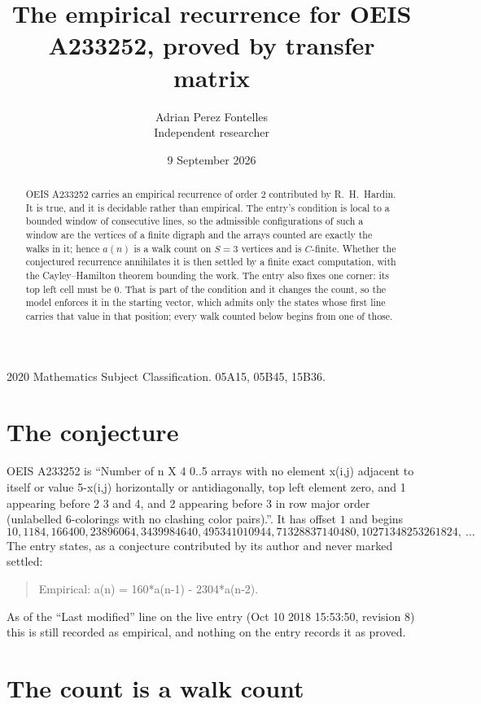 \documentclass[11pt,a4paper]{article}
\title{The empirical recurrence for OEIS A233252, proved by transfer matrix}
\author{Adrian Perez Fontelles\\ \small Independent researcher}
\date{9 September 2026}
\theoremstyle{plain}
\theoremstyle{definition}
\begin{document}
\maketitle

\begin{abstract}
OEIS A233252 carries an empirical recurrence of order $2$ contributed by R.~H.~Hardin. It is
true, and it is decidable rather than empirical. The entry's condition is local to a bounded window of consecutive lines, so
the admissible configurations of such a window are the vertices of a finite digraph and the
arrays counted are exactly the walks in it; hence $a(n)$ is a walk count on $S=3$ vertices
and is $C$-finite. Whether the conjectured recurrence annihilates it is then settled by a
finite exact computation, with the Cayley--Hamilton theorem bounding the work.
 The entry also fixes one corner: its top left cell must be $0$. That is part of the condition and it changes the count, so the model enforces it in the starting vector, which admits only the states whose first line carries that value in that position; every walk counted below begins from one of those.\end{abstract}

\noindent\small 2020 Mathematics Subject Classification. 05A15, 05B45, 15B36.\normalsize

\section{The conjecture}

OEIS A233252 is ``Number of n X 4 0..5 arrays with no element x(i,j) adjacent to itself or value 5-x(i,j) horizontally or antidiagonally, top left element zero, and 1 appearing before 2 3 and 4, and 2 appearing before 3 in row major order (unlabelled 6-colorings with no clashing color pairs).''. It has offset $1$ and begins
\[
10, 1184, 166400, 23896064, 3439984640, 495341010944, 71328837140480, 10271348253261824,\ \dots
\]
The entry states, as a conjecture contributed by its author and never marked settled:
\begin{quote}
Empirical: a(n) = 160*a(n-1) - 2304*a(n-2).
\end{quote}
As of the ``Last modified'' line on the live entry (Oct 10 2018 15:53:50, revision 8) this is still
recorded as empirical, and nothing on the entry records it as proved.

\section{The count is a walk count}
\end{document}
